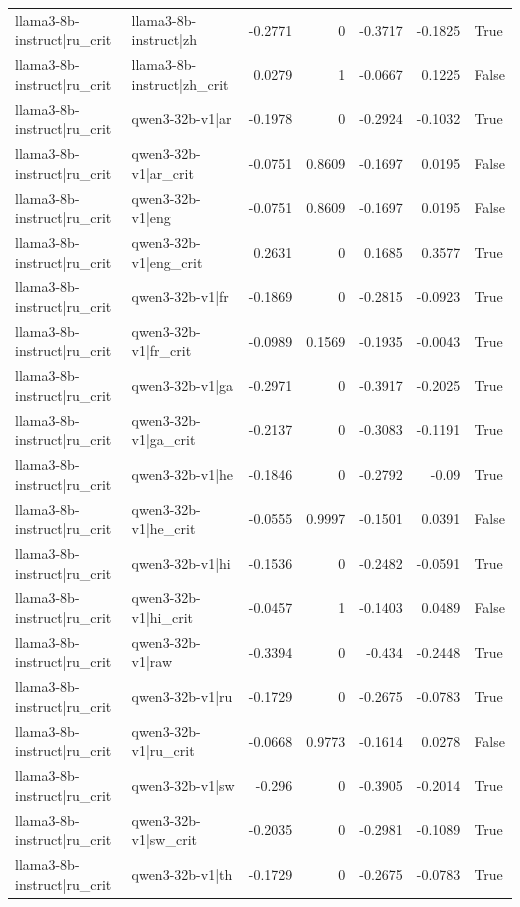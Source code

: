 \begin{table}
\begin{tabular}{l l r r r r l}
llama3-8b-instruct|ru_crit & llama3-8b-instruct|zh & -0.2771 & 0 & -0.3717 & -0.1825 & True \\
llama3-8b-instruct|ru_crit & llama3-8b-instruct|zh_crit & 0.0279 & 1 & -0.0667 & 0.1225 & False \\
llama3-8b-instruct|ru_crit & qwen3-32b-v1|ar & -0.1978 & 0 & -0.2924 & -0.1032 & True \\
llama3-8b-instruct|ru_crit & qwen3-32b-v1|ar_crit & -0.0751 & 0.8609 & -0.1697 & 0.0195 & False \\
llama3-8b-instruct|ru_crit & qwen3-32b-v1|eng & -0.0751 & 0.8609 & -0.1697 & 0.0195 & False \\
llama3-8b-instruct|ru_crit & qwen3-32b-v1|eng_crit & 0.2631 & 0 & 0.1685 & 0.3577 & True \\
llama3-8b-instruct|ru_crit & qwen3-32b-v1|fr & -0.1869 & 0 & -0.2815 & -0.0923 & True \\
llama3-8b-instruct|ru_crit & qwen3-32b-v1|fr_crit & -0.0989 & 0.1569 & -0.1935 & -0.0043 & True \\
llama3-8b-instruct|ru_crit & qwen3-32b-v1|ga & -0.2971 & 0 & -0.3917 & -0.2025 & True \\
llama3-8b-instruct|ru_crit & qwen3-32b-v1|ga_crit & -0.2137 & 0 & -0.3083 & -0.1191 & True \\
llama3-8b-instruct|ru_crit & qwen3-32b-v1|he & -0.1846 & 0 & -0.2792 & -0.09 & True \\
llama3-8b-instruct|ru_crit & qwen3-32b-v1|he_crit & -0.0555 & 0.9997 & -0.1501 & 0.0391 & False \\
llama3-8b-instruct|ru_crit & qwen3-32b-v1|hi & -0.1536 & 0 & -0.2482 & -0.0591 & True \\
llama3-8b-instruct|ru_crit & qwen3-32b-v1|hi_crit & -0.0457 & 1 & -0.1403 & 0.0489 & False \\
llama3-8b-instruct|ru_crit & qwen3-32b-v1|raw & -0.3394 & 0 & -0.434 & -0.2448 & True \\
llama3-8b-instruct|ru_crit & qwen3-32b-v1|ru & -0.1729 & 0 & -0.2675 & -0.0783 & True \\
llama3-8b-instruct|ru_crit & qwen3-32b-v1|ru_crit & -0.0668 & 0.9773 & -0.1614 & 0.0278 & False \\
llama3-8b-instruct|ru_crit & qwen3-32b-v1|sw & -0.296 & 0 & -0.3905 & -0.2014 & True \\
llama3-8b-instruct|ru_crit & qwen3-32b-v1|sw_crit & -0.2035 & 0 & -0.2981 & -0.1089 & True \\
llama3-8b-instruct|ru_crit & qwen3-32b-v1|th & -0.1729 & 0 & -0.2675 & -0.0783 & True \\

\end{tabular}
\end{table}
